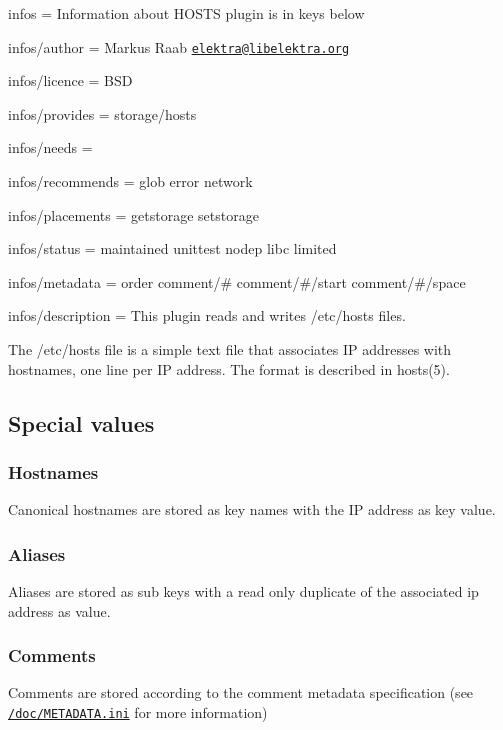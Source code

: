 
\begin{DoxyItemize}
\item infos = Information about H\+O\+S\+TS plugin is in keys below
\item infos/author = Markus Raab \href{mailto:elektra@libelektra.org}{\tt elektra@libelektra.\+org}
\item infos/licence = B\+SD
\item infos/provides = storage/hosts
\item infos/needs =
\item infos/recommends = glob error network
\item infos/placements = getstorage setstorage
\item infos/status = maintained unittest nodep libc limited
\item infos/metadata = order comment/\# comment/\#/start comment/\#/space
\item infos/description = This plugin reads and writes /etc/hosts files.
\end{DoxyItemize}

The {\ttfamily /etc/hosts} file is a simple text file that associates IP addresses with hostnames, one line per IP address. The format is described in {\ttfamily hosts(5)}.

\subsection*{Special values}

\subsubsection*{Hostnames}

Canonical hostnames are stored as key names with the IP address as key value.

\subsubsection*{Aliases}

Aliases are stored as sub keys with a read only duplicate of the associated ip address as value.

\subsubsection*{Comments}

Comments are stored according to the comment metadata specification (see \href{/home/markus/Projekte/Elektra/current/doc/METADATA.ini}{\tt /doc/\+M\+E\+T\+A\+D\+A\+TA.ini} for more information)

